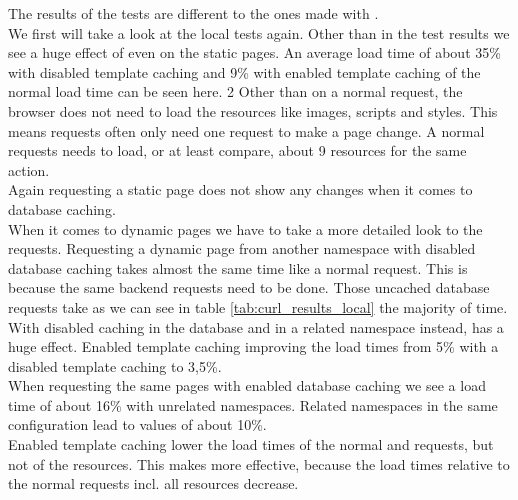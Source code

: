 The results of the \selenium{} \webdriver{} tests are different to the ones made with \curl{}.
\\
We first will take a look at the local tests again.
Other than in the \curl{} test results we see a huge effect of \lare{} even on the static pages.
An average \lare{} load time of about 35\% with disabled template caching and 9\% with enabled template caching of the normal load time can be seen here.   2
Other than on a normal request, the browser does not need to load the resources like images, scripts and styles.
This means \lare{} requests often only need one request to make a page change.
A normal requests needs to load, or at least compare, about 9 resources for the same action.
\\
Again requesting a static page does not show any changes when it comes to database caching.
\\
When it comes to dynamic pages we have to take a more detailed look to the requests.
Requesting a dynamic page from another \lare{} namespace with disabled database caching takes almost the same time like a normal request.
This is because the same backend requests need to be done.
Those uncached database requests take as we can see in table \ref{tab:curl_results_local} the majority of time.
\\
With disabled caching in the database and in a related namespace instead, \lare{} has a huge effect.
Enabled template caching improving the load times from 5\% with a disabled template caching to 3,5\%.
\\
When requesting the same pages with enabled database caching we see a \lare{} load time of about 16\% with unrelated namespaces.
Related namespaces in the same configuration lead to values of about 10\%.
\\
Enabled template caching lower the load times of the normal and \lare{} requests, but not of the resources.
This makes \lare{} more effective, because the load times relative to the normal requests incl. all resources decrease.





